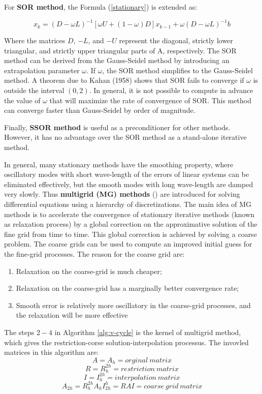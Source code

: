 For \textbf{SOR method}, the Formula (\ref{stationary}) is extended as:

\[ x_{k}=(D-\omega L)^{-1}[\omega U+(1-\omega)D]x_{k-1}+\omega(D-\omega L)^{-1}b\]

Where the matrices $D$, $-L$, and $-U$ represent the diagonal, strictly lower triangular, and strictly upper triangular parts of A, respectively. The SOR method can be derived from the Gauss-Seidel method by introducing an extrapolation parameter $\omega$. If $\omega$, the SOR method simplifies to the Gauss-Seidel method. A theorem due to Kahan (1958) shows that SOR fails to converge if $\omega$ is outside the interval $(0,2)$. In general, it is not possible to compute in advance the value of $\omega$ that will maximize the rate of convergence of SOR. This method can converge faster than Gauss-Seidel by order of magnitude.

Finally, \textbf{SSOR method} is useful as a preconditioner for other methods. However, it has no advantage over the SOR method as a stand-alone iterative method.

In general, many stationary methods have the smoothing property, where oscillatory modes with short wave-length of the errors of linear systems can be eliminated effectively, but the smooth modes with long wave-length are damped very slowly. Thus \textbf{multigrid (MG) methods} (\cite{hutchinson1986multigrid, hiptmair1998multigrid, bank1988hierarchical}) are introduced for solving differential equations using a hierarchy of discretizations. The main idea of MG methods is to accelerate the convergence of stationary iterative methods (known as relaxation process) by a global correction on the approximative solution of the fine grid from time to time. This global correction is achieved by solving a coarse problem. The coarse grids can be used to compute an improved initial guess for the fine-grid processes. The reason for the coarse grid are:

\begin{enumerate}
	\item Relaxation on the coarse-grid is much cheaper;
	\item Relaxation on the coarse-grid has a marginally better convergence rate;
	\item Smooth error is relatively more oscillatory in the coarse-grid processes, and the relaxation will be more effective
\end{enumerate}

The steps $2-4$ in Algorithm \ref{alg:v-cycle} is the kernel of multigrid method, which gives the restriction-corse solution-interpolation processus. The invovled matrices in this algorithm are:
\[A=A_h=orginal \ matrix\]
\[R=R_h^{2h}=restriction \ matrix\]
\[I=I_h^{2h}=interpolation \ matrix\]
\[A_{2h}=R_h^{2h}A_hI_{2h}^h=RAI=coarse \ grid \ matrix\]

